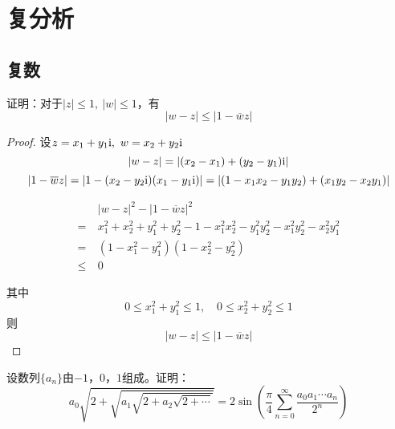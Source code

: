 \chapter{复分析}

\section{复数}

\begin{proposition}
    
    证明：对于$|z| \leq 1, \ |w| \leq 1$，有
    $$|w - z| \leq |1 - \overline{w}z|$$

\end{proposition}

\begin{proof}

    设$z = x_1 + y_1\mathrm{i},\ w = x_2 + y_2\mathrm{i}$
    $$|w - z| = | (x_2 - x_1) + (y_2 - y_1)\mathrm{i}| $$
    $$|1 - \overline{w}z| = |1 - (x_2 - y_2\mathrm{i}) (x_1 - y_1\mathrm{i})| = | (1 - x_1x_2 - y_1y_2) + (x_1y_2 - x_2y_1) |$$

    \begin{align*}
        &|w - z|^2 - |1 - \overline{w}z|^2 \\
        = \ & x_1^2 + x_2^2 + y_1^2 + y_2^2 - 1 - x_1^2x_2^2 -  y_1^2y_2^2 - x_1^2 y_2^2 -  x_2^2y_1^2 \\
        = \ & (1 - x_1^2 - y_1^2) (1 - x_2^2 - y_2^2) \\
        \leq \ & 0
    \end{align*}

    其中
    $$0 \leq x_1^2 + y_1^2 \leq 1, \quad 0 \leq x_2^2 + y_2^2 \leq 1$$
    则
    $$|w - z| \leq |1 - \overline{w}z|$$

\end{proof}

\begin{proposition}

    设数列$\{a_n\}$由$-1$，$0$，$1$组成。证明：
    $$a_0\sqrt{2 + \sqrt{a_1 \sqrt{2 + a_2\sqrt{2 + \cdots}}}} = 2 \sin{\left( \dfrac{\pi}{4} \sum\limits_{n = 0}^{\infty}{\dfrac{a_0 a_1 \cdots a_n}{2^n}}\right)}$$

\end{proposition}

